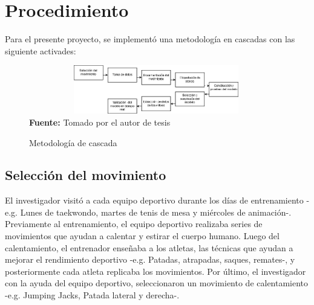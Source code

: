 \section{Procedimiento}
Para el presente proyecto, se implement\'o una metodolog\'ia en cascadas con las siguiente activades:
\begin{figure}[H]
	\caption{Metodolog\'ia de cascada}
	\label{fig:segVideo}
	\centering
	\includegraphics[width=420px,height=80px]{graphics/cascada.PNG} \\
	\textbf{Fuente:} Tomado por el autor de tesis
\end{figure} 
\subsection{Selecci\'on del movimiento}
El investigador visit\'o a cada equipo deportivo durante los d\'ias de entrenamiento -e.g. Lunes de taekwondo, martes de tenis de mesa y mi\'ercoles de animaci\'on-.  Previamente al entrenamiento, el equipo deportivo realizaba series de movimientos que ayudan a calentar y estirar el cuerpo humano.  Luego del calentamiento, el entrenador ense\~naba a los atletas, las t\'ecnicas que ayudan a mejorar el rendimiento deportivo -e.g. Patadas, atrapadas, saques, remates-, y posteriormente cada atleta replicaba los movimientos. Por \'ultimo, el investigador con la ayuda del equipo deportivo, seleccionaron un movimiento de calentamiento -e.g. Jumping Jacks, Patada lateral y derecha-.
